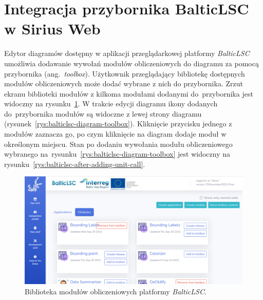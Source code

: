 \section{Integracja przybornika BalticLSC w Sirius Web}

Edytor diagramów dostępny w aplikacji przeglądarkowej platformy
\emph{BalticLSC}
umożliwia dodawanie wywołań modułów obliczeniowych do diagramu za pomocą
przybornika (ang.~\emph{toolbox}). Użytkownik
przeglądający bibliotekę dostępnych modułów
obliczeniowych może dodać wybrane z nich do przybornika. Zrzut ekranu
biblioteki modułów z kilkoma modułami dodanymi do~przybornika jest widoczny na
rysunku~\ref{rys:balticlsc-development-shelf}. W trakcie edycji
diagramu ikony dodanych do~przybornika modułów są widoczne z lewej strony
diagramu (rysunek~\ref{rys:balticlsc-diagram-toolbox}). Kliknięcie przycisku
jednego z modułów zaznacza go, po
czym kliknięcie na diagram dodaje moduł w określonym miejscu. Stan
po dodaniu wywołania modułu obliczeniowego wybranego
na~rysunku~\ref{rys:balticlsc-diagram-toolbox} jest widoczny na
rysunku~\ref{rys:balticlsc-after-adding-unit-call}.

\begin{figure}[!hb]
  \centering

  \includegraphics[width=0.95\linewidth]{./images/balticlsc-development-shelf.png}
  \caption{Biblioteka modułów obliczeniowych platformy
  \emph{BalticLSC}.}\label{rys:balticlsc-development-shelf}
\end{figure}

